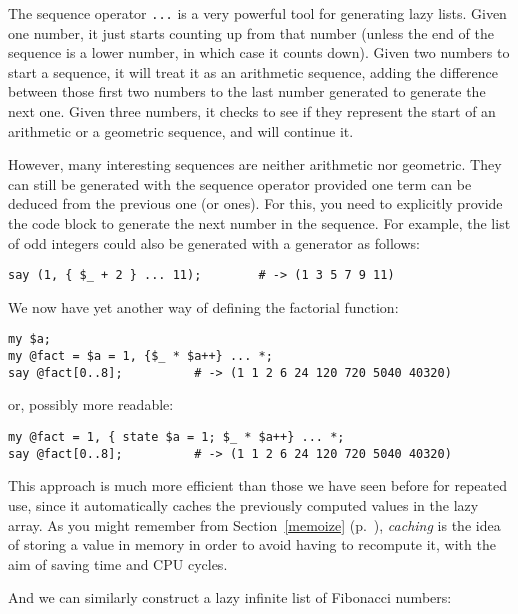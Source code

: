 The sequence operator \verb'...' is a very powerful tool 
for generating lazy lists. Given one number, it just 
starts counting up from that number (unless the 
end of the sequence is a lower number, 
in which case it counts down). Given two numbers 
to start a sequence, it will treat it as an arithmetic 
sequence, adding the difference between those first 
two numbers to the last number generated to generate 
the next one. Given three numbers, it checks to see 
if they represent the start of an arithmetic or a 
geometric sequence, and will continue it.

However, many interesting sequences are neither arithmetic 
nor geometric.  They can still be generated with the 
sequence operator provided one term can be deduced from 
the previous one (or ones). For this, you need to explicitly 
provide the code block to generate the next number in 
the sequence. For example, the list of odd integers 
could also be generated with a generator as follows:

\begin{verbatim}
say (1, { $_ + 2 } ... 11);        # -> (1 3 5 7 9 11)
\end{verbatim}

We now have yet another way of defining the factorial 
function:

\begin{verbatim}
my $a;
my @fact = $a = 1, {$_ * $a++} ... *;
say @fact[0..8];          # -> (1 1 2 6 24 120 720 5040 40320)
\end{verbatim}

or, possibly more readable:

\begin{verbatim}
my @fact = 1, { state $a = 1; $_ * $a++} ... *;
say @fact[0..8];          # -> (1 1 2 6 24 120 720 5040 40320)
\end{verbatim}


This approach is much more efficient than those we have 
seen before for repeated use, since it automatically 
caches the previously computed values in the lazy array. 
As you might remember from Section~\ref{memoize} 
(p.~\pageref{memoize}), \emph{caching} is the idea of 
storing a value in memory in order to avoid having to 
recompute it, with the aim of saving time and CPU cycles.

And we can similarly construct a lazy infinite list of 
Fibonacci numbers:

